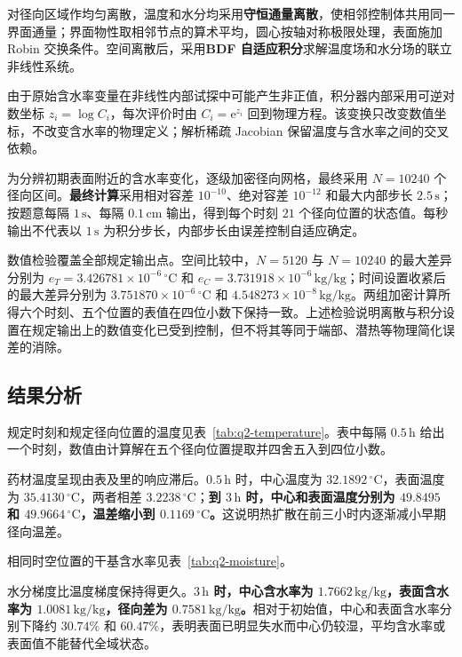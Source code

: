对径向区域作均匀离散，温度和水分均采用{\heiti\bfseries 守恒通量离散}，使相邻控制体共用同一界面通量；界面物性取相邻节点的算术平均，圆心按轴对称极限处理，表面施加 Robin 交换条件。空间离散后，采用{\heiti\bfseries BDF 自适应积分}求解温度场和水分场的联立非线性系统。

由于原始含水率变量在非线性内部试探中可能产生非正值，积分器内部采用可逆对数坐标 $z_i=\log C_i$，每次评价时由 $C_i=\mathrm e^{z_i}$ 回到物理方程。该变换只改变数值坐标，不改变含水率的物理定义；解析稀疏 Jacobian 保留温度与含水率之间的交叉依赖。

为分辨初期表面附近的含水率变化，逐级加密径向网格，最终采用 $N=10240$ 个径向区间。{\heiti\bfseries 最终计算}采用相对容差 $10^{-10}$、绝对容差 $10^{-12}$ 和最大内部步长 $2.5\,\mathrm{s}$；按题意每隔 $1\,\mathrm{s}$、每隔 $0.1\,\mathrm{cm}$ 输出，得到每个时刻 $21$ 个径向位置的状态值。每秒输出不代表以 $1\,\mathrm{s}$ 为积分步长，内部步长由误差控制自适应确定。

数值检验覆盖全部规定输出点。空间比较中，$N=5120$ 与 $N=10240$ 的最大差异分别为 $e_T=3.426781\times10^{-6}\,{}^\circ\mathrm{C}$ 和 $e_C=3.731918\times10^{-6}\,\mathrm{kg/kg}$；时间设置收紧后的最大差异分别为 $3.751870\times10^{-6}\,{}^\circ\mathrm{C}$ 和 $4.548273\times10^{-8}\,\mathrm{kg/kg}$。两组加密计算所得六个时刻、五个位置的表值在四位小数下保持一致。上述检验说明离散与积分设置在规定输出上的数值变化已受到控制，但不将其等同于端部、潜热等物理简化误差的消除。

\subsection{结果分析}

规定时刻和规定径向位置的温度见表~\ref{tab:q2-temperature}。表中每隔 $0.5\,\mathrm{h}$ 给出一个时刻，数值由计算解在五个径向位置提取并四舍五入到四位小数。



药材温度呈现由表及里的响应滞后。$0.5\,\mathrm{h}$ 时，中心温度为 $32.1892\,{}^\circ\mathrm{C}$，表面温度为 $35.4130\,{}^\circ\mathrm{C}$，两者相差 $3.2238\,{}^\circ\mathrm{C}$；{\heiti\bfseries 到 $3\,\mathrm{h}$ 时，中心和表面温度分别为 $49.8495$ 和 $49.9664\,{}^\circ\mathrm{C}$，温差缩小到 $0.1169\,{}^\circ\mathrm{C}$。}这说明热扩散在前三小时内逐渐减小早期径向温差。

相同时空位置的干基含水率见表~\ref{tab:q2-moisture}。



水分梯度比温度梯度保持得更久。{\heiti\bfseries $3\,\mathrm{h}$ 时，中心含水率为 $1.7662\,\mathrm{kg/kg}$，表面含水率为 $1.0081\,\mathrm{kg/kg}$，径向差为 $0.7581\,\mathrm{kg/kg}$。}相对于初始值，中心和表面含水率分别下降约 $30.74\%$ 和 $60.47\%$，表明表面已明显失水而中心仍较湿，平均含水率或表面值不能替代全域状态。

